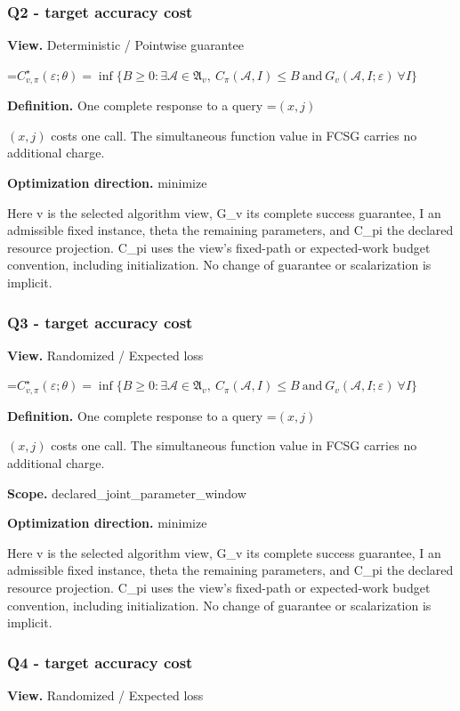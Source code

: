 \documentclass[10pt,a4paper]{article}
\newcommand{\AtlasMath}[1]{\par\begingroup\centering\setbox0=\hbox{$\displaystyle #1$}\ifdim\wd0>1.4\linewidth\typeout{ATLAS WIDE FORMULA: \the\wd0}\fi\ifdim\wd0>\linewidth\resizebox{\linewidth}{!}{\box0}\else\box0\fi\par\endgroup}
\newcommand{\AtlasInlineMath}[1]{\begingroup\setbox0=\hbox{$#1$}\ifdim\wd0>.4\linewidth\endgroup\AtlasMath{#1}\else\endgroup$#1$\fi}
\begin{document}
\subsubsection{Q2 - target accuracy cost}
\textbf{View.} Deterministic / Pointwise guarantee

\AtlasMath{C^\star_{v,\pi}(\varepsilon;\theta)=\inf\{B\ge0:\exists\mathcal A\in\mathfrak A_v,\ C_\pi(\mathcal A,I)\le B\ \text{and}\ G_v(\mathcal A,I;\varepsilon)\ \forall I\}}
\textbf{Definition.} One complete response to a query \AtlasInlineMath{(x,j)} costs one call. The simultaneous function value in FCSG carries no additional charge.

\textbf{Optimization direction.} minimize

Here v is the selected algorithm view, G\_v its complete success guarantee, I an admissible fixed instance, theta the remaining parameters, and C\_pi the declared resource projection. C\_pi uses the view's fixed-path or expected-work budget convention, including initialization. No change of guarantee or scalarization is implicit.

\subsubsection{Q3 - target accuracy cost}
\textbf{View.} Randomized / Expected loss

\AtlasMath{C^\star_{v,\pi}(\varepsilon;\theta)=\inf\{B\ge0:\exists\mathcal A\in\mathfrak A_v,\ C_\pi(\mathcal A,I)\le B\ \text{and}\ G_v(\mathcal A,I;\varepsilon)\ \forall I\}}
\textbf{Definition.} One complete response to a query \AtlasInlineMath{(x,j)} costs one call. The simultaneous function value in FCSG carries no additional charge.

\textbf{Scope.} declared\_joint\_parameter\_window

\textbf{Optimization direction.} minimize

Here v is the selected algorithm view, G\_v its complete success guarantee, I an admissible fixed instance, theta the remaining parameters, and C\_pi the declared resource projection. C\_pi uses the view's fixed-path or expected-work budget convention, including initialization. No change of guarantee or scalarization is implicit.

\subsubsection{Q4 - target accuracy cost}
\textbf{View.} Randomized / Expected loss
\end{document}
